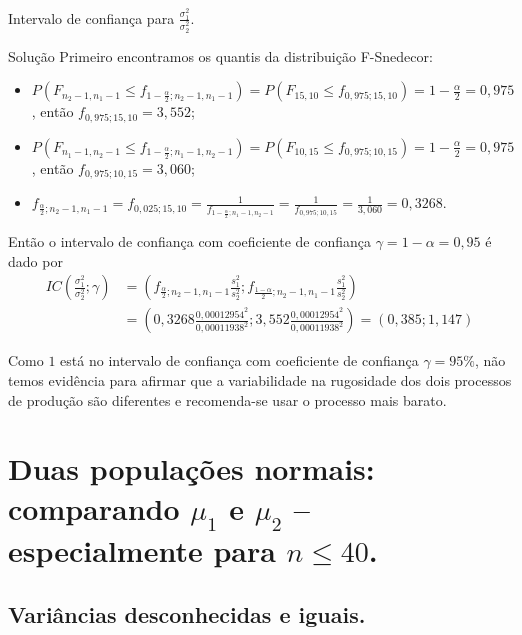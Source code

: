 \documentclass[9pt]{beamer}
\begin{document}
\begin{frame}{Intervalo de confiança para $\frac{\sigma_1^2}{\sigma_2^2}$.}

\footnotesize

\begin{block}{Solução}
	Primeiro encontramos os quantis da distribuição F-Snedecor:
	\begin{itemize}
		\item $P\left(F_{n_2-1, n_1-1} \leq f_{1-\frac{\alpha}{2};n_2-1, n_1-1} \right) = P\left(F_{15, 10} \leq f_{0,975;15, 10} \right) = 1-\frac{\alpha}{2} = 0,975$, então $f_{0,975;15, 10} = 3,552$;
		\item $P\left(F_{n_1-1, n_2-1} \leq f_{1-\frac{\alpha}{2};n_1-1, n_2-1} \right) = P\left(F_{10, 15} \leq f_{0,975;10, 15} \right) =1- \frac{\alpha}{2} = 0,975$, então $f_{0,975;10, 15} = 3,060$;
		\item $f_{\frac{\alpha}{2}; n_2-1, n_1-1}  = f_{0,025; 15, 10} = \frac{1}{f_{1-\frac{\alpha}{2}; n_1-1, n_2-1}} = \frac{1}{f_{0,975; 10, 15}} = \frac{1}{3,060} = 0,3268$.
	\end{itemize}

Então o intervalo de confiança com coeficiente de confiança $\gamma = 1-\alpha=0,95$ é dado por
\begin{align*}
	IC\left(\frac{\sigma_1^2}{\sigma_2^2}; \gamma\right) &= \left( f_{\frac{\alpha}{2}; n_2-1, n_1-1} \frac{s_1^2}{s_2^2}; f_{\frac{1-\alpha}{2}; n_2-1, n_1-1} \frac{s_1^2}{s_2^2}  \right)\\
	&= \left( 0,3268 \frac{0,00012954^2}{0,00011938^2}; 3,552 \frac{0,00012954^2}{0,00011938^2} \right) = (0,385; 1,147)
\end{align*}
\end{block}



Como $1$ está no intervalo de confiança com coeficiente de confiança $\gamma=95\%$, não temos evidência para afirmar que a variabilidade na rugosidade dos dois processos de produção são diferentes e recomenda-se usar o processo mais barato.

\normalsize
\end{frame}

\section{Duas populações normais: comparando $\mu_1$ e $\mu_2$ -- especialmente para $n \leq 40$.}

\subsection{Variâncias desconhecidas e iguais.}
\end{document}
